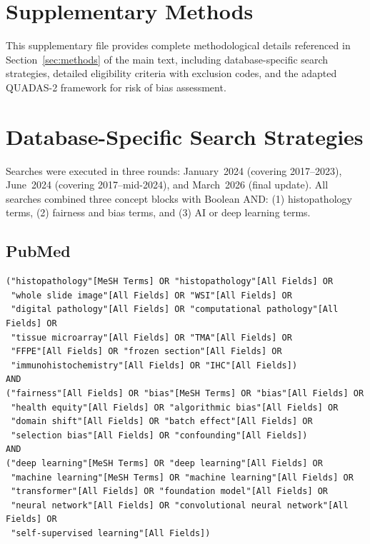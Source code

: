 
\section*{Supplementary Methods}
\label{app:methods}

This supplementary file provides complete methodological details referenced in Section~\ref{sec:methods} of the main text, including database-specific search strategies, detailed eligibility criteria with exclusion codes, and the adapted QUADAS-2 framework for risk of bias assessment.

\section{Database-Specific Search Strategies}
\label{app:methods:search}

Searches were executed in three rounds: January~2024 (covering 2017--2023), June~2024 (covering 2017--mid-2024), and March~2026 (final update). All searches combined three concept blocks with Boolean AND: (1) histopathology terms, (2) fairness and bias terms, and (3) AI or deep learning terms.

\subsection*{PubMed}

\begin{verbatim}
("histopathology"[MeSH Terms] OR "histopathology"[All Fields] OR 
 "whole slide image"[All Fields] OR "WSI"[All Fields] OR 
 "digital pathology"[All Fields] OR "computational pathology"[All Fields] OR
 "tissue microarray"[All Fields] OR "TMA"[All Fields] OR 
 "FFPE"[All Fields] OR "frozen section"[All Fields] OR 
 "immunohistochemistry"[All Fields] OR "IHC"[All Fields])
AND
("fairness"[All Fields] OR "bias"[MeSH Terms] OR "bias"[All Fields] OR 
 "health equity"[All Fields] OR "algorithmic bias"[All Fields] OR 
 "domain shift"[All Fields] OR "batch effect"[All Fields] OR 
 "selection bias"[All Fields] OR "confounding"[All Fields])
AND
("deep learning"[MeSH Terms] OR "deep learning"[All Fields] OR 
 "machine learning"[MeSH Terms] OR "machine learning"[All Fields] OR 
 "transformer"[All Fields] OR "foundation model"[All Fields] OR 
 "neural network"[All Fields] OR "convolutional neural network"[All Fields] OR
 "self-supervised learning"[All Fields])
\end{verbatim}

